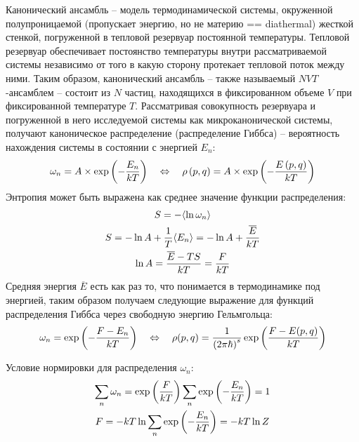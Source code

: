 \documentclass[14pt]{article}
\newcommand{\lb}{\left(}
\newcommand{\rb}{\right)}
\begin{document}
Канонический ансамбль -- модель термодинамической системы, окруженной полупроницаемой (пропускает энергию, но не материю == diathermal) жесткой стенкой, погруженной в тепловой резервуар постоянной температуры. Тепловой резервуар обеспечивает постоянство температуры внутри рассматриваемой системы независимо от того в какую сторону протекает тепловой поток между ними. Таким образом, канонический ансамбль -- также называемый $NVT$-ансамблем -- состоит из $N$ частиц, находящихся в фиксированном объеме $V$ при фиксированной температуре $T$.  Рассматривая совокупность резервуара и погруженной в него исследуемой системы как микроканонической системы, получают каноническое распределение (распределение Гиббса) -- вероятность нахождения системы в состоянии с энергией $E_n$:
\begin{gather}
	\omega_n = A \times \exp \lb - \frac{E_n}{kT} \rb \quad \Leftrightarrow \quad \rho \lb p, q \rb = A \times \exp \lb - \frac{E \lb p, q \rb}{kT} \rb \notag
\end{gather}
Энтропия может быть выражена как среднее значение функции распределения:
\begin{gather}
	S = - \langle \ln \omega_n \rangle \notag \\
	S = - \ln A + \frac{1}{T} \langle E_n \rangle = - \ln A + \frac{\overline{E}}{kT} \notag \\
	\ln A = \frac{\overline{E} - TS}{kT} = \frac{F}{kT} \notag 
\end{gather}
Средняя энергия $\overline{E}$ есть как раз то, что понимается в термодинамике под энергией, таким образом получаем следующие выражение для функций распределения Гиббса через свободную энергию Гельмгольца:
\begin{gather}
	\omega_n = \exp \lb - \frac{F - E_n}{kT} \rb \quad \Leftrightarrow \quad \rho(p, q) = \frac{1}{\lb 2 \pi \hbar \rb^{s}} \exp \lb \frac{F - E(p, q)}{kT} \rb \notag
\end{gather}

Условие нормировки для распределения $\omega_n$:
\begin{gather}
	\sum_n \omega_n = \exp \lb \frac{F}{kT} \rb \sum_n \exp \lb - \frac{E_n}{kT} \rb = 1 \notag \\
	F = - kT \ln \sum_n \exp \lb - \frac{E_n}{kT} \rb = - kT \ln Z \notag
\end{gather}
\end{document}
